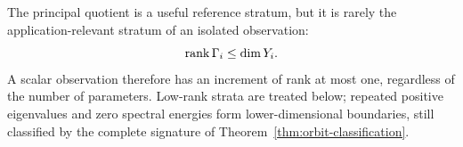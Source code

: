 \begin{remark}
The principal quotient is a useful reference stratum, but it is rarely the application-relevant stratum of an isolated observation:
\[
\operatorname{rank}\Gamma_i\leq\dim Y_i.
\]
A scalar observation therefore has an increment of rank at most one, regardless of the number of parameters. Low-rank strata are treated below; repeated positive eigenvalues and zero spectral energies form lower-dimensional boundaries, still classified by the complete signature of Theorem~\ref{thm:orbit-classification}.
\end{remark}

